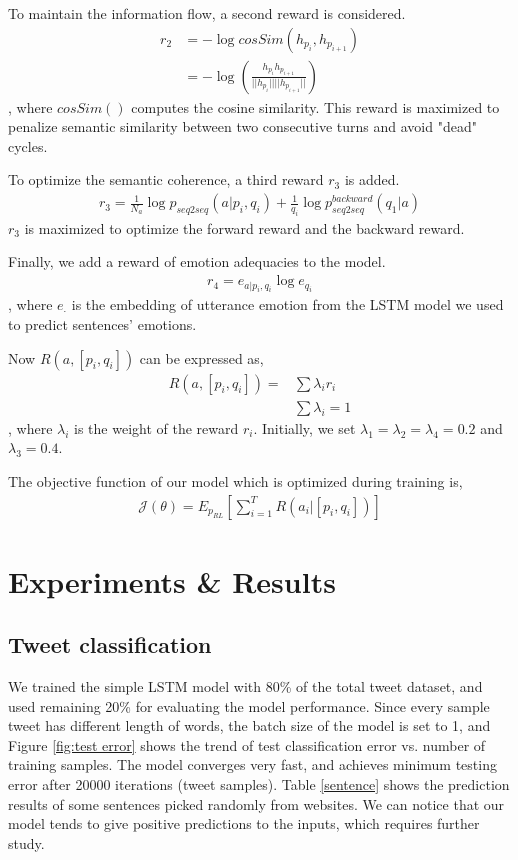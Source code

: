 \documentclass{article}
\begin{document}
To maintain the information flow, a second reward is considered.
\begin{align*}
r_2 &= - \log cosSim(h_{p_i}, h_{p_{i+1}})\\
&= - \log (\frac{h_{p_i} h_{p_{i+1}}}{||h_{p_i}|| ||h_{p_{i+1}}||})
\end{align*}
, where $cosSim()$ computes the cosine similarity. This reward is maximized to penalize semantic similarity between two consecutive turns and avoid "dead" cycles.

To optimize the semantic coherence, a third reward $r_3$ is added. \begin{align*}
r_3 = \frac{1}{N_a} \log p_{seq2seq}(a|p_i, q_i) + \frac{1}{q_i} \log p^{backward}_{seq2seq}(q_1|a)
\end{align*}
$r_3$ is maximized to optimize the forward reward and the backward reward. 

Finally, we add a reward of emotion adequacies to the model.
\begin{align*}
r_4 = e_{a|p_i, q_i} \log e_{q_i}
\end{align*}
, where $e_{\cdot}$ is the embedding of utterance emotion from the LSTM model we used to predict sentences' emotions.

Now $R(a, [p_i, q_i])$ can be expressed as,
\begin{align*}
R(a, [p_i, q_i]) = &\sum \lambda_i r_i\\
& \sum \lambda_i = 1
\end{align*}
, where $\lambda_i$ is the weight of the reward $r_i$. Initially, we set $\lambda_1 = \lambda_2 = \lambda_4 = 0.2$ and $\lambda_3 = 0.4$.

The objective function of our model which is optimized during training is, 
\begin{align*}
\mathcal{J}(\theta) = E_{p_{RL}}[\sum_{i=1}^{T} R(a_i|[p_i, q_i])]
\end{align*}


\section{Experiments \& Results}
\subsection{Tweet classification}

We trained the simple LSTM model with 80\% of the total tweet dataset, and used remaining 20\% for evaluating the model performance. Since every sample tweet has different length of words, the batch size of the model is set to 1, and Figure \ref{fig:test error} shows the trend of test classification error vs. number of training samples. The model converges very fast, and achieves minimum testing error after 20000 iterations (tweet samples). Table \ref{sentence} shows the prediction results of some sentences picked randomly from websites. We can notice that our model tends to give positive predictions to the inputs, which requires further study. 
\end{document}
